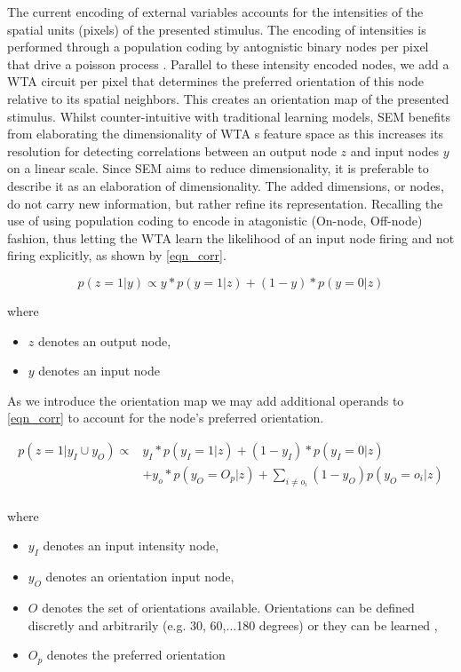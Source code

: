 \documentclass{report}
\begin{document}
The current encoding of external variables accounts for the intensities of the spatial units (pixels) of the presented stimulus. The encoding of intensities is performed through a population coding by antognistic binary nodes per pixel that drive a poisson process \cite{Nessler2010}. Parallel to these intensity encoded nodes, we add a WTA circuit per pixel that determines the preferred orientation of this node relative to its spatial neighbors. This creates an orientation map of the presented stimulus. Whilst counter-intuitive with traditional learning models, SEM benefits from elaborating the dimensionality of WTA
s feature space as this increases its resolution for detecting correlations between an output node $z$ and input nodes $y$ on a linear scale. Since SEM aims to reduce dimensionality, it is preferable to describe it as an elaboration of dimensionality. The added dimensions, or nodes, do not carry new information, but rather refine its representation. Recalling the use of using population coding to encode in atagonistic (On-node, Off-node) fashion, thus letting the WTA learn the likelihood of an input node firing and not firing explicitly, as shown by \ref{eqn_corr}.

\begin{equation}
	p(z=1|y) \propto y*p(y=1|z) + (1-y)*p(y=0|z)
	\label{eqn_corr}
\end{equation}

where
\begin{itemize}
  \item $z$ denotes an output node,
  \item $y$ denotes an input node
\end{itemize}

As we introduce the orientation map we may add additional operands to \ref{eqn_corr} to account for the node's preferred orientation.

\begin{equation}
	\begin{split}
		p(z=1|y_I \cup y_O) \propto &y_I*p(y_I=1|z) + (1-y_I)*p(y_I=0|z) \\
			&+ y_o*p(y_O=O_p|z)+\sum_{i\neq o_i} (1-y_O)p(y_O=o_i|z)\\
	\end{split}
	\label{eqn_corr2}
\end{equation}

where
\begin{itemize}
  \item $y_I$ denotes an input intensity node,
  \item $y_O$ denotes an orientation input node,
  \item $O$ denotes the set of orientations available. Orientations can be defined discretly and arbitrarily (e.g. 30, 60,...180 degrees) or they can be learned \cite{Nessler2010},
  \item $O_p$ denotes the preferred orientation
\end{itemize}
\end{document}
